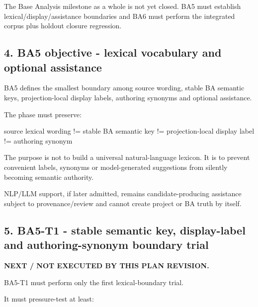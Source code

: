 \documentclass[
  11pt,
  a4paper,
]{article}
\newenvironment{Shaded}{}{}
\newcommand{\NormalTok}[1]{#1}
\begin{document}
The Base Analysis milestone as a whole is not yet closed. BA5 must
establish lexical/display/assistance boundaries and BA6 must perform the
integrated corpus plus holdout closure regression.

\subsection{4. BA5 objective - lexical vocabulary and optional
assistance}\label{ba5-objective---lexical-vocabulary-and-optional-assistance}

BA5 defines the smallest boundary among source wording, stable BA
semantic keys, projection-local display labels, authoring synonyms and
optional assistance.

The phase must preserve:

\begin{Shaded}
\begin{Highlighting}[]
\NormalTok{source lexical wording}
\NormalTok{    != stable BA semantic key}
\NormalTok{    != projection{-}local display label}
\NormalTok{    != authoring synonym}
\end{Highlighting}
\end{Shaded}

The purpose is not to build a universal natural-language lexicon. It is
to prevent convenient labels, synonyms or model-generated suggestions
from silently becoming semantic authority.

NLP/LLM support, if later admitted, remains candidate-producing
assistance subject to provenance/review and cannot create project or BA
truth by itself.

\subsection{5. BA5-T1 - stable semantic key, display-label and
authoring-synonym boundary
trial}\label{ba5-t1---stable-semantic-key-display-label-and-authoring-synonym-boundary-trial}

\textbf{NEXT / NOT EXECUTED BY THIS PLAN REVISION.}

BA5-T1 must perform only the first lexical-boundary trial.

It must pressure-test at least:
\end{document}
